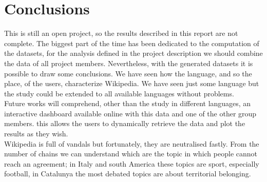 \chapter{Conclusions}
This is still an open project, so the results described in this report are not complete. The biggest
part of the time has been dedicated to the computation of the datasets, for the analysis defined in the project
description we should combine the data of all project members. Nevertheless, with the generated
datasets it is possible to draw some conclusions. We have seen how the language, and so the place,
of the users, characterize Wikipedia. We have seen just some language but the study could be extended
to all available languages without problems.\\

Future works will comprehend, other than the study in different languages, an interactive dashboard
available online with this data and one of the other group members. this allows the users to
dynamically retrieve the data and plot the results as they wish.\\

Wikipedia is full of vandals but fortunately, they are neutralised fastly. From the number of chains we
can understand which are the topic in which people cannot reach an agreement; in Italy and south
America these topics are sport, especially football, in Catalunya the most debated topics are about
territorial belonging.

